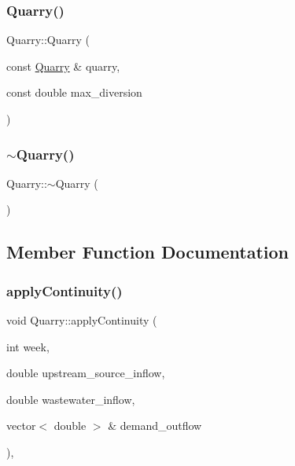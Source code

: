 \mbox{\label{classQuarry_a5a43f5a3f1cb837bc313046cf82b49e3_a5a43f5a3f1cb837bc313046cf82b49e3}} 
\subsubsection{\texorpdfstring{Quarry()}{Quarry()}\hspace{0.1cm}{\footnotesize\ttfamily [5/5]}}
{\footnotesize\ttfamily Quarry\+::\+Quarry (\begin{DoxyParamCaption}\item[{const \mbox{\hyperlink{classQuarry}{Quarry}} \&}]{quarry,  }\item[{const double}]{max\+\_\+diversion }\end{DoxyParamCaption})}

\mbox{\label{classQuarry_a6c528c6222e8e5adc134db5cafbe62e3_a6c528c6222e8e5adc134db5cafbe62e3}} 
\subsubsection{\texorpdfstring{$\sim$\+Quarry()}{~Quarry()}}
{\footnotesize\ttfamily Quarry\+::$\sim$\+Quarry (\begin{DoxyParamCaption}{ }\end{DoxyParamCaption})}



\subsection{Member Function Documentation}
\mbox{\label{classQuarry_a6999b854a740ce92baaa610cf5b08bd9_a6999b854a740ce92baaa610cf5b08bd9}} 
\subsubsection{\texorpdfstring{apply\+Continuity()}{applyContinuity()}}
{\footnotesize\ttfamily void Quarry\+::apply\+Continuity (\begin{DoxyParamCaption}\item[{int}]{week,  }\item[{double}]{upstream\+\_\+source\+\_\+inflow,  }\item[{double}]{wastewater\+\_\+inflow,  }\item[{vector$<$ double $>$ \&}]{demand\+\_\+outflow }\end{DoxyParamCaption})\hspace{0.3cm}{\ttfamily [override]}, {\ttfamily [virtual]}}

